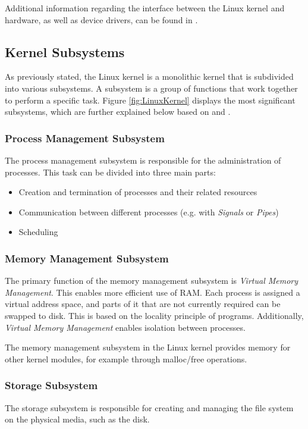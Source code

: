 Additional information regarding the interface between the Linux kernel and hardware, as well as device drivers, can be found in \cite{like09}.


\subsection{Kernel Subsystems}

As previously stated, the Linux kernel is a monolithic kernel that is subdivided into various subsystems. A subsystem is a group of functions that work together to perform a specific task. Figure \ref{fig:LinuxKernel} displays the most significant subsystems, which are further explained below based on \cite{like03} and \cite{like09}.

\subsubsection{Process Management Subsystem}
The process management subsystem is responsible for the administration of processes. This task can be divided into three main parts:

\begin{itemize}
\item Creation and termination of processes and their related resources
\item Communication between different processes (e.g. with \textit{Signals} or \textit{Pipes})
\item Scheduling
\end{itemize}

\subsubsection{Memory Management Subsystem}
The primary function of the memory management subsystem is \textit{Virtual Memory Management}. This enables more efficient use of RAM. Each process is assigned a virtual address space, and parts of it that are not currently required can be swapped to disk. This is based on the locality principle of programs. Additionally, \textit{Virtual Memory Management} enables isolation between processes.

The memory management subsystem in the Linux kernel provides memory for other kernel modules, for example through malloc/free operations.

\subsubsection{Storage Subsystem}
The storage subsystem is responsible for creating and managing the file system on the physical media, such as the disk.


